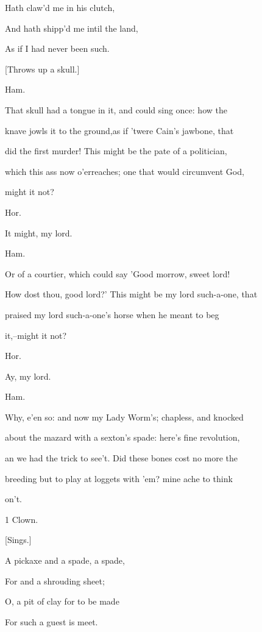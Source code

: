 \documentclass[12pt]{book}
\begin{document}
     Hath claw'd me in his clutch,

   And hath shipp'd me intil the land,

     As if I had never been such.



[Throws up a skull.]



Ham.

That skull had a tongue in it, and could sing once: how the

knave jowls it to the ground,as if 'twere Cain's jawbone, that

did the first murder! This might be the pate of a politician,

which this ass now o'erreaches; one that would circumvent God,

might it not?



Hor.

It might, my lord.



Ham.

Or of a courtier, which could say 'Good morrow, sweet lord!

How dost thou, good lord?' This might be my lord such-a-one, that

praised my lord such-a-one's horse when he meant to beg

it,--might it not?



Hor.

Ay, my lord.



Ham.

Why, e'en so: and now my Lady Worm's; chapless, and knocked

about the mazard with a sexton's spade: here's fine revolution,

an we had the trick to see't. Did these bones cost no more the

breeding but to play at loggets with 'em? mine ache to think

on't.



1 Clown.

[Sings.]

   A pickaxe and a spade, a spade,

     For and a shrouding sheet;

   O, a pit of clay for to be made

     For such a guest is meet.
\end{document}
